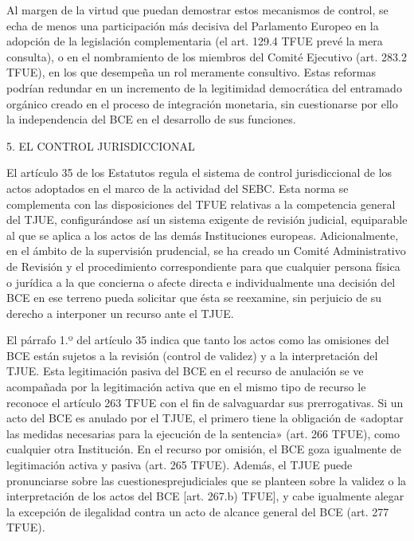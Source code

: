 \documentclass[10pt,a4paper]{article}
\begin{document}
Al margen de la virtud que puedan demostrar estos mecanismos de control, se echa de menos una participación más decisiva del Parlamento Europeo en la adopción de la legislación complementaria (el art. 129.4 TFUE prevé la mera consulta), o en el nombramiento de los miembros del Comité Ejecutivo (art. 283.2  TFUE), en los que desempeña un rol meramente consultivo. Estas reformas podrían redundar en un incremento de la legitimidad democrática del entramado orgánico creado en el proceso de integración monetaria, sin cuestionarse por ello la independencia del BCE en el desarrollo de sus funciones.



5. EL CONTROL JURISDICCIONAL

El artículo 35 de los Estatutos regula el sistema de control jurisdiccional de los actos adoptados en el marco de la actividad del SEBC. Esta norma se complementa con las disposiciones del TFUE relativas a la competencia general del TJUE, configurándose así un sistema exigente de revisión judicial, equiparable al que se aplica a los actos de las demás Instituciones europeas. Adicionalmente, en el ámbito de la supervisión prudencial, se ha creado un Comité Administrativo de Revisión y el procedimiento correspondiente para que cualquier persona física o jurídica a la que concierna o afecte directa e individualmente una decisión del BCE en ese terreno pueda solicitar que ésta se reexamine, sin perjuicio de su derecho a interponer un recurso ante el TJUE.

El párrafo 1.º del artículo 35 indica que tanto los actos como las omisiones del BCE están sujetos a la revisión (control de validez) y a la interpretación del TJUE. Esta legitimación pasiva del BCE en el recurso de anulación se ve acompañada por la legitimación activa que en el mismo tipo de recurso le reconoce el artículo 263 TFUE con el fin de salvaguardar sus prerrogativas. Si un acto del BCE es anulado por el TJUE, el primero tiene la obligación de «adoptar las medidas necesarias para la ejecución de la sentencia» (art. 266 TFUE), como cualquier otra Institución. En el recurso por omisión, el BCE goza igualmente de legitimación activa y pasiva (art. 265 TFUE). Además, el TJUE puede pronunciarse sobre las cuestionesprejudiciales que se planteen sobre la validez o la interpretación de los actos del BCE [art. 267.b) TFUE], y cabe igualmente alegar la excepción de ilegalidad contra un acto de alcance general del BCE (art. 277 TFUE).
\end{document}
